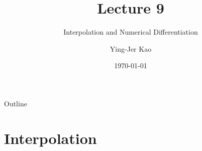 \documentclass{beamer}
\title[Interpolation and Numerical Differentiation] %
{Lecture 9}
\subtitle
{Interpolation and Numerical Differentiation } %
\author[Ying-Jer Kao] %
{Ying-Jer Kao}
\institute[National Taiwan University] %
{
  Department of Physics\\
 National Taiwan University
  }
\date[Numerical Analysis and Programming] %
{\today}
\begin{document}
\begin{frame}
  \titlepage
\end{frame}

\begin{frame}{Outline}
  \tableofcontents
\end{frame}



\section[Interpolation]{Interpolation}
\end{document}
